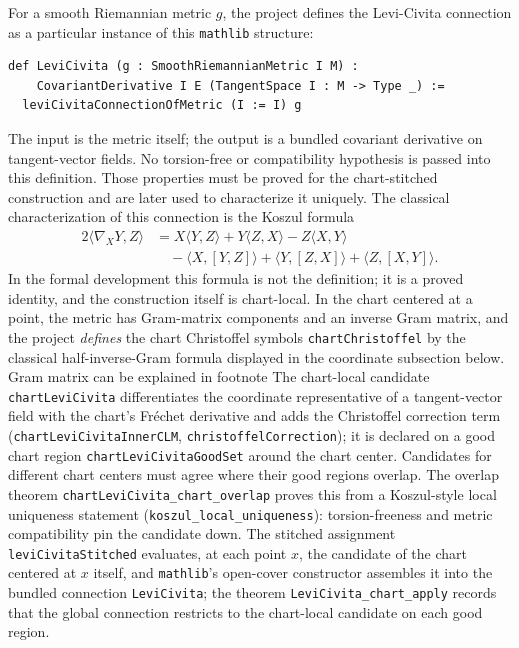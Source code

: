 \documentclass[11pt]{article}
\theoremstyle{plain}
\theoremstyle{definition}
\theoremstyle{remark}
\newcommand{\leanref}[1]{\nolinkurl{#1}}
\begin{document}
For a smooth Riemannian metric $g$, the project defines the Levi-Civita
connection as a particular instance of this \texttt{mathlib} structure:
\begin{Verbatim}[breaklines=true,breakanywhere=true,fontsize=\small]
def LeviCivita (g : SmoothRiemannianMetric I M) :
    CovariantDerivative I E (TangentSpace I : M -> Type _) :=
  leviCivitaConnectionOfMetric (I := I) g
\end{Verbatim}
The input is the metric itself; the output is a bundled covariant derivative
on tangent-vector fields.  No torsion-free or compatibility hypothesis is
passed into this definition.  Those properties must be proved for the
chart-stitched construction and are later used to characterize it uniquely.
The classical characterization of this connection is the Koszul formula
\[
\begin{aligned}
2\langle \nabla_XY,Z\rangle
&=
X\langle Y,Z\rangle
+
Y\langle Z,X\rangle
-
Z\langle X,Y\rangle                                      \\
&\quad
-\langle X,[Y,Z]\rangle
+
\langle Y,[Z,X]\rangle
+
\langle Z,[X,Y]\rangle .
\end{aligned}
\]
{\color{red}{We defined should do this by koszul, but not sure if that 's on field level or point level}}
In the formal development this formula is not the definition; it is a proved
identity, and the construction itself is chart-local.  In the chart centered
at a point, the metric has Gram-matrix components and an inverse Gram matrix,
and the project \emph{defines} the chart Christoffel symbols
\leanref{chartChristoffel} by the classical half-inverse-Gram formula
displayed in the coordinate subsection below.  {\color{red}Gram matrix can be explained in footnote} The chart-local candidate
\leanref{chartLeviCivita} differentiates the coordinate representative of a
tangent-vector field with the chart's Fr\'echet derivative and adds the
Christoffel correction term
(\leanref{chartLeviCivitaInnerCLM}, \leanref{christoffelCorrection}); it is
declared on a good chart region \leanref{chartLeviCivitaGoodSet} around the
chart center.  Candidates for different chart centers must agree where their
good regions overlap.  The overlap theorem
\leanref{chartLeviCivita_chart_overlap} proves this from a Koszul-style local
uniqueness statement (\leanref{koszul_local_uniqueness}): torsion-freeness
and metric compatibility pin the candidate down.  The stitched assignment
\leanref{leviCivitaStitched} evaluates, at each point $x$, the candidate of
the chart centered at $x$ itself, and \texttt{mathlib}'s open-cover
constructor assembles it into the bundled connection \leanref{LeviCivita};
the theorem \leanref{LeviCivita_chart_apply} records that the global
connection restricts to the chart-local candidate on each good region.
\end{document}
